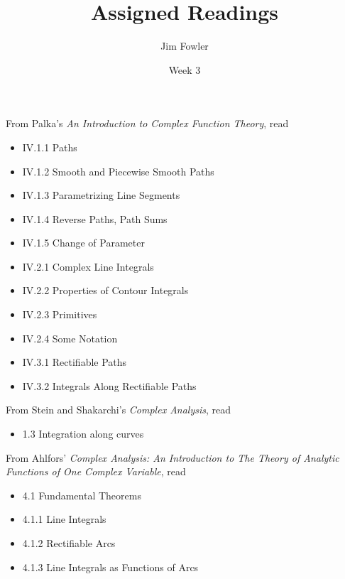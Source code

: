 \documentclass{homework}
\author{Jim Fowler}
\title{Assigned Readings}
\date{Week 3}
\begin{document}
\maketitle


From Palka's \textit{An Introduction to Complex Function Theory}, read
\begin{itemize}
\item IV.1.1 Paths
\item IV.1.2 Smooth and Piecewise Smooth Paths
\item IV.1.3 Parametrizing Line Segments
\item IV.1.4 Reverse Paths, Path Sums
\item IV.1.5 Change of Parameter
\item IV.2.1 Complex Line Integrals
\item IV.2.2 Properties of Contour Integrals
\item IV.2.3 Primitives
\item IV.2.4 Some Notation
\item IV.3.1 Rectifiable Paths
\item IV.3.2 Integrals Along Rectifiable Paths
\end{itemize}

From Stein and Shakarchi's \textit{Complex Analysis}, read
\begin{itemize}
\item 1.3 Integration along curves
\end{itemize}

From Ahlfors' \textit{Complex Analysis: An Introduction to The Theory of Analytic Functions of One Complex Variable}, read
\begin{itemize}
\item 4.1 Fundamental Theorems
\item 4.1.1 Line Integrals
\item 4.1.2 Rectifiable Arcs
\item 4.1.3 Line Integrals as Functions of Arcs
\end{itemize}
\end{document}
